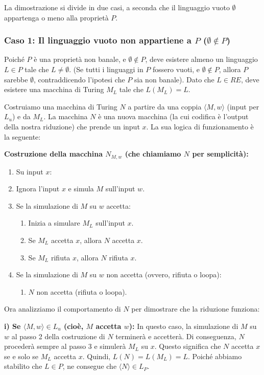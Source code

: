 \documentclass[a4paper]{article}
\begin{document}
La dimostrazione si divide in due casi, a seconda che il linguaggio vuoto $\emptyset$ appartenga o meno alla proprietà $P$.

\subsubsection{Caso 1: Il linguaggio vuoto non appartiene a $P$ ($\emptyset \notin P$)}
Poiché $P$ è una proprietà non banale, e $\emptyset \notin P$, deve esistere almeno un linguaggio $L \in P$ tale che $L \neq \emptyset$. (Se tutti i linguaggi in $P$ fossero vuoti, e $\emptyset \notin P$, allora $P$ sarebbe $\emptyset$, contraddicendo l'ipotesi che $P$ sia non banale).
Dato che $L \in RE$, deve esistere una macchina di Turing $M_L$ tale che $L(M_L) = L$.

Costruiamo una macchina di Turing $N$ a partire da una coppia $\langle M,w \rangle$ (input per $L_u$) e da $M_L$. La macchina $N$ è una nuova macchina (la cui codifica è l'output della nostra riduzione) che prende un input $x$. La sua logica di funzionamento è la seguente:

\textbf{Costruzione della macchina $N_{M,w}$ (che chiamiamo $N$ per semplicità):}
\begin{enumerate}
    \item Su input $x$:
    \item Ignora l'input $x$ e simula $M$ sull'input $w$.
    \item Se la simulazione di $M$ su $w$ accetta:
        \begin{enumerate}
            \item Inizia a simulare $M_L$ sull'input $x$.
            \item Se $M_L$ accetta $x$, allora $N$ accetta $x$.
            \item Se $M_L$ rifiuta $x$, allora $N$ rifiuta $x$.
        \end{enumerate}
    \item Se la simulazione di $M$ su $w$ non accetta (ovvero, rifiuta o loopa):
        \begin{enumerate}
            \item $N$ non accetta (rifiuta o loopa).
        \end{enumerate}
\end{enumerate}

Ora analizziamo il comportamento di $N$ per dimostrare che la riduzione funziona:

\textbf{i) Se $\langle M,w \rangle \in L_u$ (cioè, $M$ accetta $w$):}
In questo caso, la simulazione di $M$ su $w$ al passo 2 della costruzione di $N$ terminerà e accetterà. Di conseguenza, $N$ procederà sempre al passo 3 e simulerà $M_L$ su $x$. Questo significa che $N$ accetta $x$ se e solo se $M_L$ accetta $x$.
Quindi, $L(N) = L(M_L) = L$.
Poiché abbiamo stabilito che $L \in P$, ne consegue che $\langle N \rangle \in L_P$.
\end{document}
